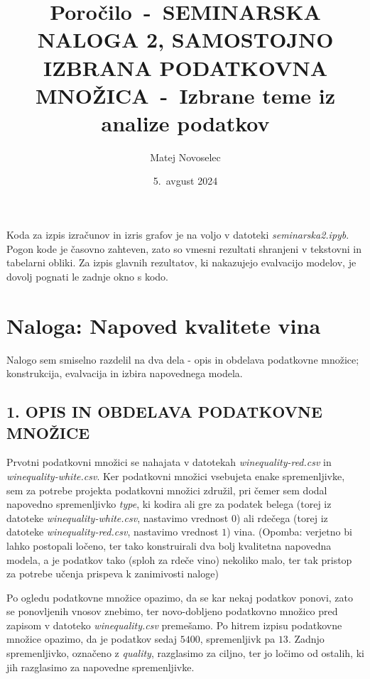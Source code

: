 \documentclass{article}
\begin{document}
\title{Poročilo~-~SEMINARSKA NALOGA 2, SAMOSTOJNO IZBRANA PODATKOVNA MNOŽICA~-~Izbrane teme iz analize podatkov \\
}
\author{
    Matej Novoselec\\
}
\date{5.\ avgust 2024}

\maketitle

Koda za izpis izračunov in izris grafov je na voljo v datoteki \textit{seminarska2.ipyb}. 
Pogon kode je časovno zahteven, zato so vmesni rezultati shranjeni v tekstovni in tabelarni obliki. 
Za izpis glavnih rezultatov, ki nakazujejo evalvacijo modelov, je dovolj pognati le zadnje okno s kodo. 

\section*{Naloga: Napoved kvalitete vina}

Nalogo sem smiselno razdelil na dva dela - opis in obdelava podatkovne množice; konstrukcija, evalvacija in izbira napovednega modela.  

\subsection*{1. OPIS IN OBDELAVA PODATKOVNE MNOŽICE}

Prvotni podatkovni množici se nahajata v datotekah \textit{winequality-red.csv} in \textit{winequality-white.csv}. 
Ker podatkovni množici vsebujeta enake spremenljivke, sem za potrebe projekta podatkovni množici združil, pri čemer sem dodal napovedno spremenljivko \textit{type}, ki kodira  ali gre za podatek belega (torej iz datoteke \textit{winequality-white.csv}, nastavimo vrednost $0$) ali rdečega (torej iz datoteke \textit{winequality-red.csv}, nastavimo vrednost $1$) vina. 
(Opomba: verjetno bi lahko postopali ločeno, ter tako konstruirali dva bolj kvalitetna napovedna modela, a je podatkov tako (sploh za rdeče vino) nekoliko malo, ter tak pristop za potrebe učenja prispeva k zanimivosti naloge)

Po ogledu podatkovne množice opazimo, da se kar nekaj podatkov ponovi, zato se ponovljenih vnosov znebimo, ter novo-dobljeno podatkovno množico pred zapisom v datoteko \textit{winequality.csv} premešamo.
Po hitrem izpisu podatkovne množice opazimo, da je podatkov sedaj $5400$, spremenljivk pa $13$. 
Zadnjo spremenljivko, označeno z \textit{quality}, razglasimo za ciljno, ter jo ločimo od ostalih, ki jih razglasimo za napovedne spremenljivke. 
\end{document}
